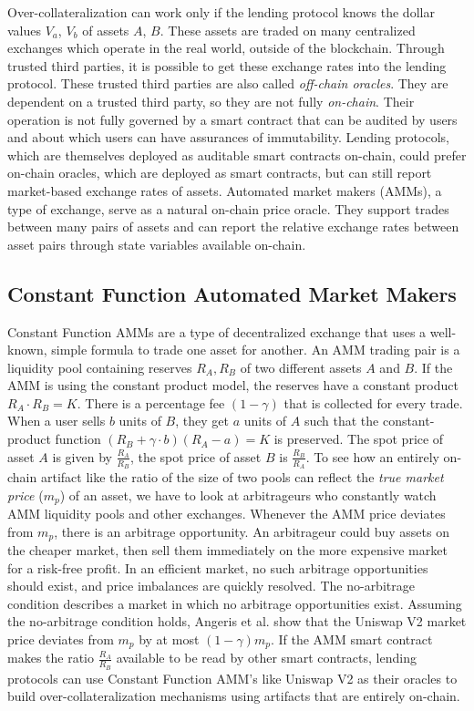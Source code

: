 \documentclass[conference]{IEEEtran}
\begin{document}
Over-collateralization can work only if the lending protocol knows the dollar values $V_a$, $V_b$ of assets $A$, $B$. These assets are traded on many centralized exchanges which operate in the real world, outside of the blockchain. Through trusted third parties, it is possible to get these exchange rates into the lending protocol. These trusted third parties are also called \textit{off-chain oracles}. They are dependent on a trusted third party, so they are not fully \textit{on-chain}. Their operation is not fully governed by a smart contract that can be audited by users and about which users can have assurances of immutability. Lending protocols, which are themselves deployed as auditable smart contracts on-chain, could prefer on-chain oracles, which are deployed as smart contracts, but can still report market-based exchange rates of assets. Automated market makers (AMMs), a type of exchange, serve as a natural on-chain price oracle. They support trades between many pairs of assets and can report the relative exchange rates between asset pairs through state variables available on-chain. 

\subsection{Constant Function Automated Market Makers}
Constant Function AMMs \cite{Zhang2018UniV1} are a type of decentralized exchange that uses a well-known, simple formula to trade one asset for another. An AMM trading pair is a liquidity pool containing reserves $R_A, R_B$ of two different assets $A$ and $B$. If the AMM is using the constant product model, the reserves have a constant product $R_A \cdot R_B = K$. There is a percentage fee $(1 - \gamma)$ that is collected for every trade. When a user sells $b$ units of $B$, they get $a$ units of $A$ such that the constant-product function $(R_B + \gamma \cdot b) (R_A - a) = K$ is preserved. The spot price of asset $A$ is given by $\frac{R_A}{R_B}$, the spot price of asset $B$ is $\frac{R_B}{R_A}$. To see how an entirely on-chain artifact like the ratio of the size of two pools can reflect the \textit{true market price} ($m_p$) of an asset, we have to look at arbitrageurs who constantly watch AMM liquidity pools and other exchanges. Whenever the AMM price deviates from $m_p$, there is an arbitrage opportunity. An arbitrageur could buy assets on the cheaper market, then sell them immediately on the more expensive market for a risk-free profit. In an efficient market, no such arbitrage opportunities should exist, and price imbalances are quickly resolved. The no-arbitrage condition describes a market in which no arbitrage opportunities exist.  Assuming the no-arbitrage condition holds, Angeris et al. \cite{angeris2019uniswap} show that the Uniswap V2 market price deviates from $m_p$ by at most $(1-\gamma)m_p$. If the AMM smart contract makes the ratio $\frac{R_A}{R_B}$ available to be read by other smart contracts, lending protocols can use Constant Function AMM's like Uniswap V2 as their oracles to build over-collateralization mechanisms using artifacts that are entirely on-chain.
\end{document}
